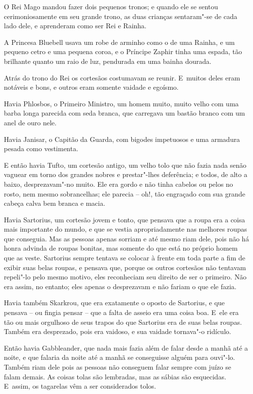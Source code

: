 O Rei Mago mandou fazer dois pequenos tronos; e quando ele se sentou
cerimoniosamente em seu grande trono, as duas crianças sentaram"-se de
cada lado dele, e aprenderam como ser Rei e Rainha.

A Princesa Bluebell usava um robe de arminho como o de uma Rainha, e um
pequeno cetro e uma pequena coroa, e o Príncipe Zaphir tinha uma espada,
tão brilhante quanto um raio de luz, pendurada em uma bainha dourada.

Atrás do trono do Rei os cortesãos costumavam se reunir. E~muitos deles
eram notáveis e bons, e outros eram somente vaidade e egoísmo.

Havia Phlosbos, o Primeiro Ministro, um homem muito, muito velho com uma
barba longa parecida com seda branca, que carregava um bastão branco com
um anel de ouro nele.

Havia Janisar, o Capitão da Guarda, com bigodes impetuosos e uma
armadura pesada como vestimenta.

E então havia Tufto, um cortesão antigo, um velho tolo que não fazia
nada senão vaguear em torno dos grandes nobres e prestar"-lhes
deferência; e todos, de alto a baixo, desprezavam"-no muito. Ele era
gordo e não tinha cabelos ou pelos no rosto, nem mesmo sobrancelhas; ele
parecia -- oh!, tão engraçado com sua grande cabeça calva bem branca e
macia.

Havia Sartorius, um cortesão jovem e tonto, que pensava que a roupa era
a coisa mais importante do mundo, e que se vestia apropriadamente nas
melhores roupas que conseguia. Mas as pessoas apenas sorriam e até mesmo
riam dele, pois não há honra advinda de roupas bonitas, mas somente do
que está no próprio homem que as veste. Sartorius sempre tentava se
colocar à frente em toda parte a fim de exibir suas belas roupas, e
pensava que, porque os outros cortesãos não tentavam repeli"-lo pelo
mesmo motivo, eles reconheciam seu direito de ser o primeiro. Não era
assim, no entanto; eles apenas o desprezavam e não fariam o que ele
fazia.

Havia também Skarkrou, que era exatamente o oposto de Sartorius, e que
pensava -- ou fingia pensar -- que a falta de asseio era uma coisa boa.
E~ele era tão ou mais orgulhoso de seus trapos do que Sartorius era de
suas belas roupas. Também era desprezado, pois era vaidoso, e sua
vaidade tornava"-o ridículo.

Então havia Gabbleander, que nada mais fazia além de falar desde a manhã
até a noite, e que falaria da noite até a manhã se conseguisse alguém
para ouvi"-lo. Também riam dele pois as pessoas não conseguem falar
sempre com juízo se falam demais. As coisas tolas são lembradas, mas as
sábias são esquecidas. E~assim, os tagarelas vêm a ser considerados
tolos.

